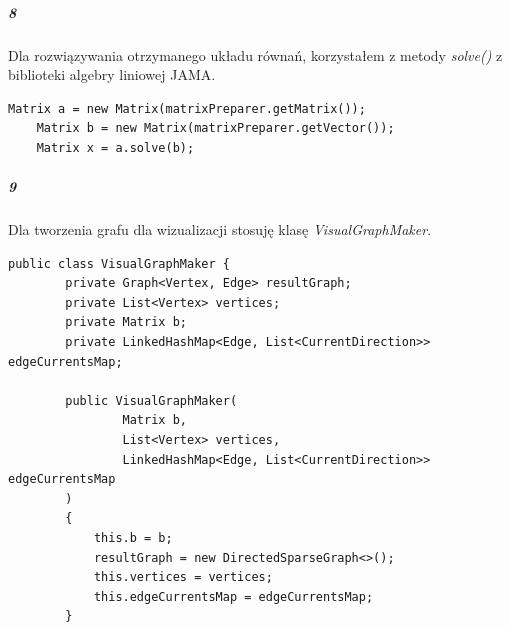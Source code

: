 \documentclass[12pt,a4paper]{article}
\begin{document}
\subparagraph{8} Dla rozwiązywania otrzymanego układu równań, korzystałem z
metody \emph{solve()} z biblioteki algebry liniowej JAMA.
\begin{Verbatim}[fontsize=\small]
    Matrix a = new Matrix(matrixPreparer.getMatrix());
    Matrix b = new Matrix(matrixPreparer.getVector());
    Matrix x = a.solve(b);
\end{Verbatim}
\subparagraph{9} Dla tworzenia grafu dla wizualizacji stosuję klasę
\emph{VisualGraphMaker}.
\begin{Verbatim}[fontsize=\small]
    public class VisualGraphMaker {
        private Graph<Vertex, Edge> resultGraph;
        private List<Vertex> vertices;
        private Matrix b;
        private LinkedHashMap<Edge, List<CurrentDirection>> edgeCurrentsMap;

        public VisualGraphMaker(
                Matrix b,
                List<Vertex> vertices,
                LinkedHashMap<Edge, List<CurrentDirection>> edgeCurrentsMap
        )
        {
            this.b = b;
            resultGraph = new DirectedSparseGraph<>();
            this.vertices = vertices;
            this.edgeCurrentsMap = edgeCurrentsMap;
        }


\end{Verbatim}
\end{document}

